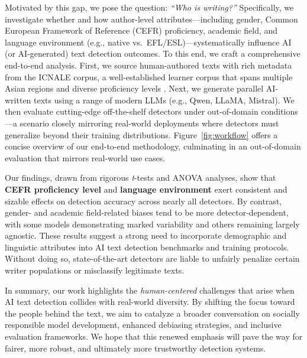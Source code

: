 Motivated by this gap, we pose the question: \emph{``Who is writing?''} Specifically, we investigate whether and how author-level attributes---including gender, Common European Framework of Reference (CEFR) proficiency, academic field, and language environment (e.g., native vs.\ EFL/ESL)---systematically influence AI (or AI-generated) text detection outcomes. To this end, we craft a comprehensive end-to-end analysis. First, we source human-authored texts with rich metadata from the ICNALE corpus, a well-established learner corpus that spans multiple Asian regions and diverse proficiency levels \citep{Ishikawa2013icnale}. Next, we generate parallel AI-written texts using a range of modern LLMs (e.g., Qwen, LLaMA, Mistral). We then evaluate cutting-edge off-the-shelf detectors under out-of-domain conditions---a scenario closely mirroring real-world deployments where detectors must generalize beyond their training distributions. Figure~\ref{fig:workflow} offers a concise overview of our end-to-end methodology, culminating in an out-of-domain evaluation that mirrors real-world use cases.

Our findings, drawn from rigorous \emph{t}-tests and ANOVA analyses, show that \textbf{CEFR proficiency level} and \textbf{language environment} exert consistent and sizable effects on detection accuracy across nearly all detectors. By contrast, gender- and academic field-related biases tend to be more detector-dependent, with some models demonstrating marked variability and others remaining largely agnostic. These results suggest a strong need to incorporate demographic and linguistic attributes into AI text detection benchmarks and training protocols. Without doing so, state-of-the-art detectors are liable to unfairly penalize certain writer populations or misclassify legitimate texts.

In summary, our work highlights the \emph{human-centered} challenges that arise when AI text detection collides with real-world diversity. By shifting the focus toward the people behind the text, we aim to catalyze a broader conversation on socially responsible model development, enhanced debiasing strategies, and inclusive evaluation frameworks. We hope that this renewed emphasis will pave the way for fairer, more robust, and ultimately more trustworthy detection systems. 

